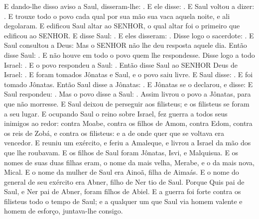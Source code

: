 {  E dando-lhe disso aviso a Saul, disseram-lhe: . E ele disse: .
  E Saul voltou a dizer: . E trouxe todo o povo cada qual por sua mão sua vaca aquela noite, e ali degolaram.
  E edificou Saul altar ao SENHOR, o qual altar foi o primeiro que edificou ao SENHOR.
  E disse Saul: . E eles disseram: . Disse logo o sacerdote: .
  E Saul consultou a Deus:  Mas o SENHOR não lhe deu resposta aquele dia.
  Então disse Saul: . E não houve em todo o povo quem lhe respondesse.
  Disse logo a todo Israel: . E o povo respondeu a Saul: .
  Então disse Saul ao SENHOR Deus de Israel: . E foram tomados Jônatas e Saul, e o povo saiu livre.
  E Saul disse: . E foi tomado Jônatas.
  Então Saul disse a Jônatas: . E Jônatas se o declarou, e disse:  %
  E Saul respondeu: .
  Mas o povo disse a Saul: . Assim livrou o povo a Jônatas, para que não morresse.
  E Saul deixou de perseguir aos filisteus; e os filisteus se foram a seu lugar.
  E ocupando Saul o reino sobre Israel, fez guerra a todos seus inimigos ao redor: contra Moabe, contra os filhos de Amom, contra Edom, contra os reis de Zobá, e contra os filisteus: e a de onde quer que se voltava era vencedor.
  E reuniu um exército, e feriu a Amaleque, e livrou a Israel da mão dos que lhe roubavam.
  E os filhos de Saul foram Jônatas, Isvi, e Malquisua. E os nomes de suas duas filhas eram, o nome da mais velha, Merabe, e o da mais nova, Mical.
  E o nome da mulher de Saul era Ainoã, filha de Aimaás. E o nome do general de seu exército era Abner, filho de Ner tio de Saul.
  Porque Quis pai de Saul, e Ner pai de Abner, foram filhos de Abiel.
  E a guerra foi forte contra os filisteus todo o tempo de Saul; e a qualquer um que Saul via homem valente e homem de esforço, juntava-lhe consigo.
\par }

